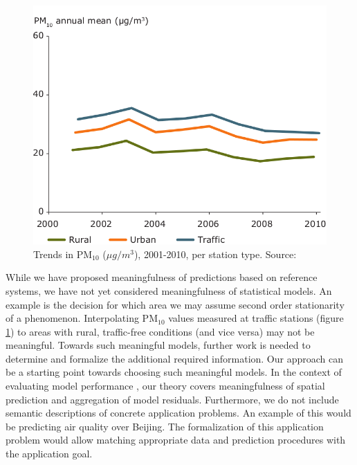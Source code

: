 \documentclass[final,authoryear,1p,times]{elsarticle}
\begin{document}
\begin{figure}
\begin{center}
\includegraphics[width=0.6\columnwidth]{pm10.png}
\end{center}
\caption{ Trends in PM$_{10}$ ($\mu g / m^3$), 2001-2010, per station type.
Source: \cite{eea}}
\label{eea}
\end{figure}

While we have proposed meaningfulness of predictions based on reference systems, we have not yet considered meaningfulness of statistical models.  An example is the decision for which area we may assume second order stationarity of a phenomenon. Interpolating PM$_{10}$ values measured at traffic stations (figure \ref{eea}) to areas with rural, traffic-free conditions (and vice versa) may not be meaningful. Towards such meaningful models, further work is needed to determine and formalize the additional required information. Our approach can be a starting point towards choosing such meaningful models. In the context of evaluating model performance \citep{Bennett2013}, our theory covers meaningfulness of spatial prediction and aggregation of model residuals. Furthermore, we do not include semantic descriptions of concrete application problems. An example of this would be predicting air quality over Beijing. The formalization of this application problem would allow matching appropriate data and prediction procedures with the application goal.
\end{document}

